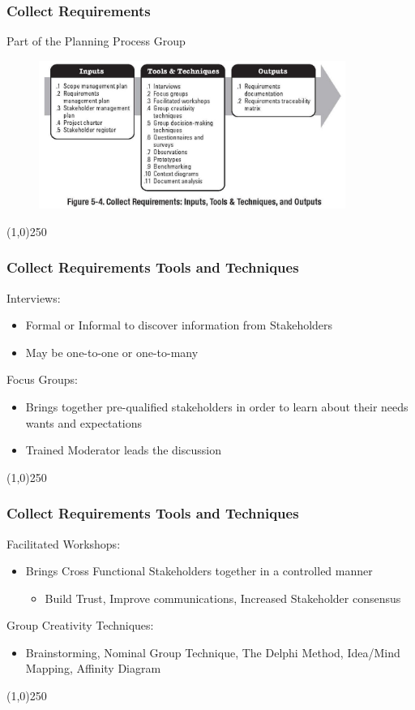 \begin{frame}
\frametitle{Collect Requirements}{Part of the Planning Process Group}
\begin{figure}
	\centering
		\includegraphics[width = 10cm]{images/Fig5-4.jpg}
	\label{fig:5-4}
\end{figure}
\end{frame}\begin{center}\line(1,0){250}\end{center}



\begin{frame}
\frametitle{Collect Requirements \hfill Tools and Techniques}
Interviews:
\begin{itemize}
	\item Formal or Informal to discover information from Stakeholders
	\item May be one-to-one or one-to-many
\end{itemize}
Focus Groups:
\begin{itemize}
	\item Brings together pre-qualified stakeholders in order to learn about their needs wants and expectations
	\item Trained Moderator leads the discussion
\end{itemize}
\end{frame}\begin{center}\line(1,0){250}\end{center}



\begin{frame}
\frametitle{Collect Requirements \hfill Tools and Techniques}
Facilitated Workshops:
\begin{itemize}
	\item Brings Cross Functional Stakeholders together in a controlled manner
	\begin{itemize}
		\item Build Trust, Improve communications, Increased Stakeholder consensus
	\end{itemize}
\end{itemize}
Group Creativity Techniques:
\begin{itemize}
	\item Brainstorming, Nominal Group Technique, The Delphi Method, Idea/Mind Mapping, Affinity Diagram
\end{itemize}
\end{frame}\begin{center}\line(1,0){250}\end{center}



